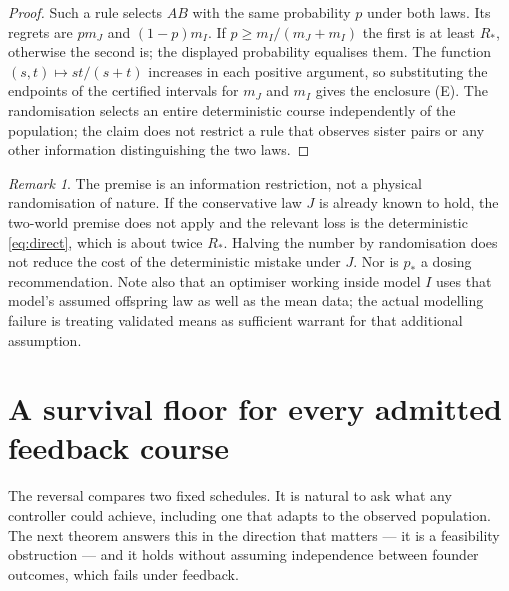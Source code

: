 \documentclass[11pt]{article}
\theoremstyle{remark}
\newtheorem{remark}[theorem]{Remark}
\begin{document}
\begin{proof}
Such a rule selects $AB$ with the same probability $p$ under both laws. Its
regrets are $pm_J$ and $(1-p)m_I$. If $p\ge m_I/(m_J+m_I)$ the first is at least
$R_*$, otherwise the second is; the displayed probability equalises them. The
function $(s,t)\mapsto st/(s+t)$ increases in each positive argument, so
substituting the endpoints of the certified intervals for $m_J$ and $m_I$ gives
the enclosure \textup{(E)}. The randomisation selects an entire deterministic
course independently of the population; the claim does not restrict a rule that
observes sister pairs or any other information distinguishing the two laws.
\end{proof}

\begin{remark}
The premise is an information restriction, not a physical randomisation of
nature. If the conservative law $J$ is already known to hold, the two-world
premise does not apply and the relevant loss is the deterministic
\eqref{eq:direct}, which is about twice $R_*$. Halving the number by
randomisation does not reduce the cost of the deterministic mistake under $J$.
Nor is $p_*$ a dosing recommendation. Note also that an optimiser working inside
model $I$ uses that model's assumed offspring law as well as the mean data; the
actual modelling failure is treating validated means as sufficient warrant for
that additional assumption.
\end{remark}

\section{A survival floor for every admitted feedback course}\label{sec:floor}

The reversal compares two fixed schedules. It is natural to ask what any
controller could achieve, including one that adapts to the observed population.
The next theorem answers this in the direction that matters --- it is a
feasibility obstruction --- and it holds without assuming independence between
founder outcomes, which fails under feedback.
\end{document}
